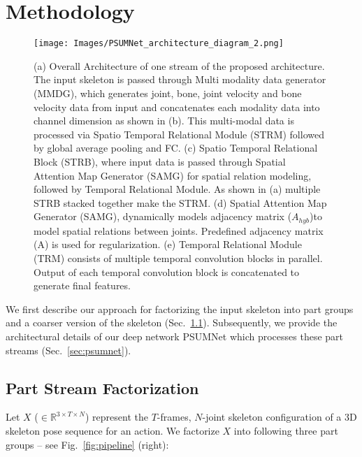 \documentclass[runningheads]{llncs}
\begin{document}
\section{Methodology}
\label{sec:methodology}

\begin{figure*}[!t]
  \centering
  \texttt{[image: Images/PSUMNet\_architecture\_diagram\_2.png]}
  \caption{(a) Overall Architecture of one stream of the proposed architecture. The input skeleton is passed through Multi modality data generator (MMDG), which generates joint, bone, joint velocity and bone velocity data from input and concatenates each modality data into channel dimension as shown in (b). This multi-modal data is processed via Spatio Temporal Relational Module (STRM) followed by global average pooling and FC. (c) Spatio Temporal Relational Block (STRB), where input data is passed through Spatial Attention Map Generator (SAMG) for spatial relation modeling, followed by Temporal Relational Module. As shown in (a) multiple STRB stacked together make the STRM. (d) Spatial Attention Map Generator (SAMG), dynamically models adjacency matrix ($A_{hyb}$)to model spatial relations between joints. Predefined adjacency matrix (A) is used for regularization.  (e) Temporal Relational Module (TRM) consists of multiple temporal convolution blocks in parallel. Output of each temporal convolution block is concatenated to generate final features.}
  \label{fig:architecture}
\end{figure*}

We first describe our approach for factorizing the input skeleton into part groups and a coarser version of the skeleton (Sec.~\ref{sec:partstream}). Subsequently, we provide the architectural details of our deep network PSUMNet which processes these part streams (Sec.~\ref{sec:psumnet}).

\subsection{Part Stream Factorization}
\label{sec:partstream}



Let $X$ ($\in \mathbb{R}^{3 \times T \times N}$) represent the $T$-frames, $N$-joint skeleton configuration of a 3D skeleton pose sequence for an action. We factorize $X$ into following three part groups -- see Fig.~\ref{fig:pipeline} (right):
\end{document}
